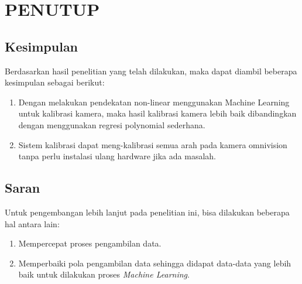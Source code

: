 \chapter{PENUTUP}
\label{chap:penutup}


\section{Kesimpulan}
\label{sec:kesimpulan}

Berdasarkan hasil penelitian yang telah dilakukan, maka dapat diambil beberapa kesimpulan sebagai berikut:

\begin{enumerate}[nolistsep]

  \item Dengan melakukan pendekatan non-linear menggunakan Machine Learning untuk kalibrasi kamera, maka hasil kalibrasi kamera lebih baik dibandingkan dengan menggunakan regresi polynomial sederhana.

  \item Sistem kalibrasi dapat meng-kalibrasi semua arah pada kamera omnivision tanpa perlu instalasi ulang hardware jika ada masalah.

\end{enumerate}

\section{Saran}
\label{chap:saran}


Untuk pengembangan lebih lanjut pada penelitian ini, bisa dilakukan beberapa hal antara lain:

\begin{enumerate}[nolistsep]

  \item Mempercepat proses pengambilan data.

  \item Memperbaiki pola pengambilan data sehingga didapat data-data yang lebih baik untuk dilakukan proses \textit{Machine Learning}.
\end{enumerate}

